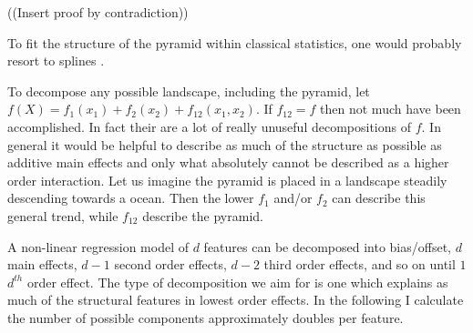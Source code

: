((Insert proof by contradiction))

To fit the structure of the pyramid within classical statistics, one would probably resort to splines \cite{harrell2015regression}.

To decompose any possible landscape, including the pyramid, let 
$f(X)= f_1(x_1) + f_2(x_2) + f_12(x_1,x_2)$. If $f_{12} = f$ then not much have been accomplished. In fact their are a lot of really unuseful decompositions of $f$. In general it would be helpful to describe as much of the structure as possible as additive main effects and only what absolutely cannot be described as a higher order interaction. Let us imagine the pyramid is placed in a landscape steadily descending towards a ocean. Then the lower $f_1$ and/or $f_2$ can describe this general trend, while $f_12$ describe the pyramid.

A non-linear regression model of $d$ features can be decomposed into bias/offset, $d$ main effects, $d-1$ second order effects, $d-2$ third order effects, and so on until $1$ $d^{th}$ order effect. The type of decomposition we aim for is one which explains as much of the structural features in lowest order effects. In the following I calculate the number of possible components approximately doubles per feature.

